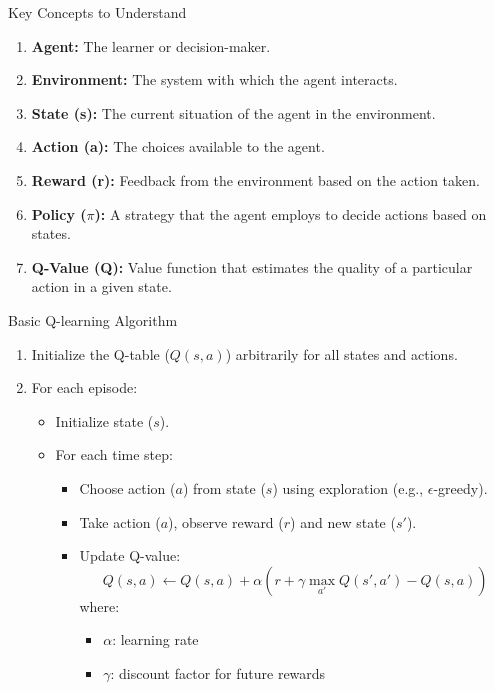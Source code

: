 \documentclass[aspectratio=169]{beamer}
\begin{document}
\begin{frame}{Key Concepts to Understand}
    \begin{enumerate}
        \item \textbf{Agent:} The learner or decision-maker.
        \item \textbf{Environment:} The system with which the agent interacts.
        \item \textbf{State (s):} The current situation of the agent in the environment.
        \item \textbf{Action (a):} The choices available to the agent.
        \item \textbf{Reward (r):} Feedback from the environment based on the action taken.
        \item \textbf{Policy ($\pi$):} A strategy that the agent employs to decide actions based on states.
        \item \textbf{Q-Value (Q):} Value function that estimates the quality of a particular action in a given state.
    \end{enumerate}
\end{frame}

\begin{frame}{Basic Q-learning Algorithm}
    \begin{enumerate}
        \item Initialize the Q-table ($Q(s, a)$) arbitrarily for all states and actions.
        \item For each episode:
        \begin{itemize}
            \item Initialize state ($s$).
            \item For each time step:
            \begin{itemize}
                \item Choose action ($a$) from state ($s$) using exploration (e.g., $\epsilon$-greedy).
                \item Take action ($a$), observe reward ($r$) and new state ($s'$).
                \item Update Q-value:
                \begin{equation}
                    Q(s, a) \leftarrow Q(s, a) + \alpha \left( r + \gamma \max_{a'} Q(s', a') - Q(s, a) \right)
                \end{equation}
                where:
                \begin{itemize}
                    \item $\alpha$: learning rate
                    \item $\gamma$: discount factor for future rewards
                \end{itemize}
            \end{itemize}
        \end{itemize}
    \end{enumerate}
\end{frame}
\end{document}
